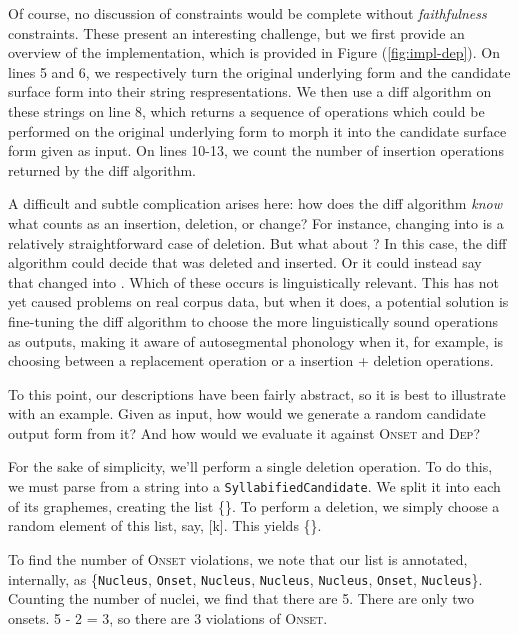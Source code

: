 \documentclass[12pt]{article}
\newcommand{\dep}{\textsc{Dep}}
\newcommand{\onset}{\textsc{Onset}}
\newcommand{\pref}[1]{(\ref{#1})}
\begin{document}
Of course, no discussion of constraints would be complete without
\textit{faithfulness} constraints. These present an interesting challenge, but
we first provide an overview of the implementation, which is provided in Figure
\pref{fig:impl-dep}. On lines 5 and 6, we respectively turn the original
underlying form and the candidate surface form into their string
respresentations. We then use a diff algorithm on these strings on line 8,
which returns a sequence of operations which could be performed on the original
underlying form to morph it into the candidate surface form given as input. On
lines 10-13, we count the number of insertion operations returned by the diff
algorithm.

A difficult and subtle complication arises here: how does the diff algorithm
\textit{know} what counts as an insertion, deletion, or change? For instance,
changing  into \textipa{[ow\'ok\'ow\'o]} is a
relatively straightforward case of deletion. But what about
\textipa{[ow\'ak\'iow\'o]}? In this case, the diff algorithm could decide that
\textipa{[\'o]} was deleted and \textipa{[\'a]} inserted. Or it could instead
say that \textipa{[\'o]} changed into \textipa{[\'a]}. Which of these occurs is
linguistically relevant. This has not yet caused problems on real corpus data,
but when it does, a potential solution is fine-tuning the diff algorithm to
choose the more linguistically sound operations as outputs, making it aware of
autosegmental phonology when it, for example, is choosing between a replacement
operation or a insertion + deletion operations.

To this point, our descriptions have been fairly abstract, so it is best to
illustrate with an example. Given  as input, how
would we generate a random candidate output form from it? And how would we
evaluate it against \onset{} and \dep?

For the sake of simplicity, we'll perform a single deletion operation. To do
this, we must parse  from a string into a
\texttt{SyllabifiedCandidate}. We split it into each of its graphemes, creating
the list \{\}. To perform a deletion, we simply
choose a random element of this list, say, [k]. This yields
\{\}.

To find the number of \onset{} violations, we note that our list is annotated,
internally, as \{\texttt{Nucleus}, \texttt{Onset}, \texttt{Nucleus},
\texttt{Nucleus}, \texttt{Nucleus}, \texttt{Onset}, \texttt{Nucleus}\}.
Counting the number of nuclei, we find that there are 5. There are only two
onsets. 5 - 2 = 3, so there are 3 violations of \onset.
\end{document}
